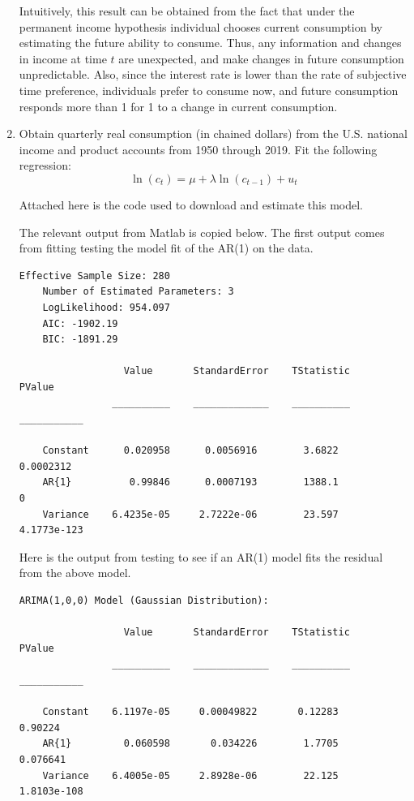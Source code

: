 \documentclass[11pt]{article}
\begin{document}
\begin{enumerate}
Intuitively, this result can be obtained from the fact that under the permanent income hypothesis individual chooses current consumption by estimating the future ability to consume. Thus, any information and changes in income at time $t$ are unexpected, and make changes in future consumption unpredictable. Also, since the interest rate is lower than the rate of subjective time preference, individuals prefer to consume now, and future consumption responds more than 1 for 1 to a change in current consumption.

\newpage
\item  Obtain quarterly real consumption (in chained dollars) from the U.S.
national income and product accounts from 1950 through 2019. Fit the following
regression:
\[
\ln(c_t) = \mu + \lambda \ln(c_{t-1}) + u_t
\]

Attached here is the code used to download and estimate this model.



The relevant output from Matlab is copied below.
The first output comes from fitting testing the model fit of the AR(1) on the data.
\begin{lstlisting}[caption={Matlab output from AR(1) model on data}, label=lst:data-output]
    Effective Sample Size: 280
    Number of Estimated Parameters: 3
    LogLikelihood: 954.097
    AIC: -1902.19
    BIC: -1891.29

                  Value       StandardError    TStatistic      PValue   
                __________    _____________    __________    ___________

    Constant      0.020958      0.0056916        3.6822        0.0002312
    AR{1}          0.99846      0.0007193        1388.1                0
    Variance    6.4235e-05     2.7222e-06        23.597      4.1773e-123
\end{lstlisting}

Here is the output from testing to see if an AR(1) model fits the residual from the above model.
\begin{lstlisting}[caption={Matlab output from AR(1) model on residuals}, label=lst:resid-output]
    ARIMA(1,0,0) Model (Gaussian Distribution):

                  Value       StandardError    TStatistic      PValue   
                __________    _____________    __________    ___________

    Constant    6.1197e-05     0.00049822       0.12283          0.90224
    AR{1}         0.060598       0.034226        1.7705         0.076641
    Variance    6.4005e-05     2.8928e-06        22.125      1.8103e-108
\end{lstlisting}


\end{enumerate}
\end{document}
